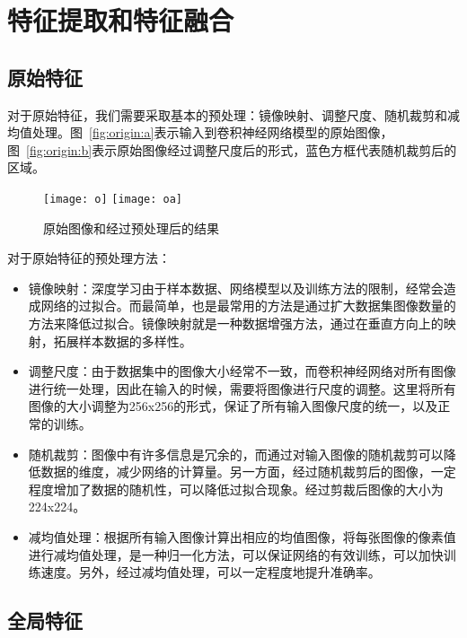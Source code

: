 \section{特征提取和特征融合}

\subsection{原始特征}
对于原始特征，我们需要采取基本的预处理：镜像映射、调整尺度、随机裁剪和减均值处理。图~\ref{fig:origin:a}表示输入到卷积神经网络模型的原始图像，图~\ref{fig:origin:b}表示原始图像经过调整尺度后的形式，蓝色方框代表随机裁剪后的区域。

\begin{figure}[H]
  \centering%
  \subcaptionbox{\label{fig:origin:a}} %
    {\texttt{[image: o]}}%
  \hspace{4em}%
  \subcaptionbox{\label{fig:origin:b}}
      {\texttt{[image: oa]}}
  \caption{原始图像和经过预处理后的结果}
  \label{fig:origin}
\end{figure}

对于原始特征的预处理方法：
\begin{itemize}
\item 镜像映射：深度学习由于样本数据、网络模型以及训练方法的限制，经常会造成网络的过拟合。而最简单，也是最常用的方法是通过扩大数据集图像数量的方法来降低过拟合。镜像映射就是一种数据增强方法，通过在垂直方向上的映射，拓展样本数据的多样性。
\item 调整尺度：由于数据集中的图像大小经常不一致，而卷积神经网络对所有图像进行统一处理，因此在输入的时候，需要将图像进行尺度的调整。这里将所有图像的大小调整为256x256的形式，保证了所有输入图像尺度的统一，以及正常的训练。
\item 随机裁剪：图像中有许多信息是冗余的，而通过对输入图像的随机裁剪可以降低数据的维度，减少网络的计算量。另一方面，经过随机裁剪后的图像，一定程度增加了数据的随机性，可以降低过拟合现象。经过剪裁后图像的大小为224x224。
\item 减均值处理：根据所有输入图像计算出相应的均值图像，将每张图像的像素值进行减均值处理，是一种归一化方法，可以保证网络的有效训练，可以加快训练速度。另外，经过减均值处理，可以一定程度地提升准确率。
\end{itemize}



\subsection{全局特征}

